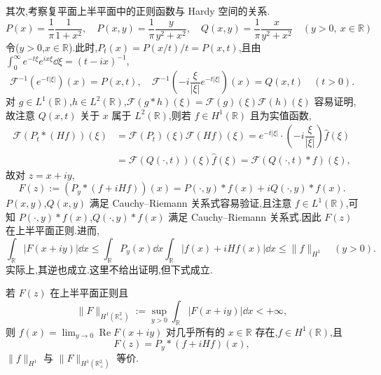 其次,考察复平面上半平面中的正则函数与 Hardy 空间的关系.
\begin{equation*}
P(x) = \frac{1}{\pi}\frac{1}{1 + x^{2}}, \quad P(x, y) = \frac{1}{\pi}\frac{y}{y^{2} + x^{2}}, \quad Q(x, y) = \frac{1}{\pi}\frac{x}{y^{2} + x^{2}} \quad (y > 0,\ x \in \mathbb{R})
\end{equation*}
令($y > 0$,$x \in \mathbb{R}$).此时,$P_{t}(x) = P(x/t)/t = P(x, t)$,且由 $\int_{0}^{\infty}e^{-t\xi}e^{ix\xi}\dd\xi = (t - ix)^{-1}$,
\begin{equation*}
\mathcal{F}^{-1}(e^{-t|\xi|})(x) = P(x, t), \quad \mathcal{F}^{-1}\left(-i\frac{\xi}{|\xi|}e^{-t|\xi|}\right)(x) = Q(x, t) \quad (t > 0).
\end{equation*}
对 $g \in L^{1}(\mathbb{R})$,$h \in L^{2}(\mathbb{R})$,$\mathcal{F}(g * h)(\xi) = \mathcal{F}(g)(\xi)\mathcal{F}(h)(\xi)$ 容易证明,故注意 $Q(x, t)$ 关于 $x$ 属于 $L^{2}(\mathbb{R})$,则若 $f \in H^{1}(\mathbb{R})$ 且为实值函数,
\begin{equation*}
\begin{aligned}
\mathcal{F}(P_{t} * (Hf))(\xi) &= \mathcal{F}(P_{t})(\xi)\mathcal{F}(Hf)(\xi) = e^{-t|\xi|}\cdot\left(-i\dfrac{\xi}{|\xi|}\right)\hat{f}(\xi) \\
&= \mathcal{F}(Q(\cdot, t))(\xi)\hat{f}(\xi) = \mathcal{F}(Q(\cdot, t) * f)(\xi),
\end{aligned}
\end{equation*}
故对 $z = x + iy$,
\begin{equation*}
F(z) := \left(P_{y} * (f + iHf)\right)(x) = P(\cdot, y) * f(x) + iQ(\cdot, y) * f(x).
\end{equation*}
$P(x, y)$,$Q(x, y)$ 满足 Cauchy--Riemann 关系式容易验证,且注意 $f \in L^{1}(\mathbb{R})$,可知 $P(\cdot, y) * f(x)$,$Q(\cdot, y) * f(x)$ 满足 Cauchy--Riemann 关系式.因此 $F(z)$ 在上半平面正则.进而,
\begin{equation*}
\int_{\mathbb{R}}|F(x + iy)|\dd x \leq \int_{\mathbb{R}}P_{y}(x)\dd x\int_{\mathbb{R}}|f(x) + iHf(x)|\dd x \leq \| f \|_{H^{1}} \quad (y > 0).
\end{equation*}
实际上,其逆也成立.这里不给出证明,但下式成立.

\begin{theorem}\label{thm:1.12.5}
若 $F(z)$ 在上半平面正则且
\begin{equation*}
\| F \|_{H^{1}(\mathbb{R}_{+}^{2})} := \sup_{y > 0}\int_{\mathbb{R}}|F(x + iy)|\dd x < +\infty,
\end{equation*}
则 $f(x) = \lim_{y \to 0}\operatorname{Re}F(x + iy)$ 对几乎所有的 $x \in \mathbb{R}$ 存在,$f \in H^{1}(\mathbb{R})$,且
\begin{equation*}
F(z) = P_{y} * (f + iHf)(x),
\end{equation*}
$\| f \|_{H^{1}}$ 与 $\| F \|_{H^{1}(\mathbb{R}_{+}^{2})}$ 等价.
\end{theorem}

